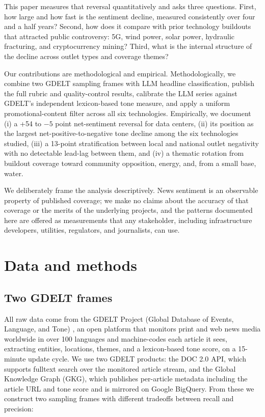 \documentclass[11pt]{article}
\begin{document}
This paper measures that reversal quantitatively and asks three questions.
First, how large and how fast is the sentiment decline, measured
consistently over four and a half years? Second, how does it compare with
prior technology buildouts that attracted public controversy: 5G, wind
power, solar power, hydraulic fracturing, and cryptocurrency mining? Third,
what is the internal structure of the decline across outlet types and
coverage themes?

Our contributions are methodological and empirical. Methodologically, we
combine two GDELT sampling frames with LLM headline classification, publish
the full rubric and quality-control results, calibrate the LLM series
against GDELT's independent lexicon-based tone measure, and apply a uniform
promotional-content filter across all six technologies. Empirically, we
document (i) a +54 to $-5$ point net-sentiment reversal for data centers,
(ii) its position as the largest net-positive-to-negative tone decline among
the six technologies studied, (iii) a 13-point stratification between local
and national outlet negativity with no detectable lead-lag between them, and
(iv) a thematic rotation from buildout coverage toward community opposition,
energy, and, from a small base, water.

We deliberately frame the analysis descriptively. News sentiment is an
observable property of published coverage; we make no claims about the
accuracy of that coverage or the merits of the underlying projects, and the
patterns documented here are offered as measurements that any stakeholder,
including infrastructure developers, utilities, regulators, and journalists,
can use.

\section{Data and methods}

\subsection{Two GDELT frames}

All raw data come from the GDELT Project (Global Database of Events,
Language, and Tone) \cite{leetaru2013}, an open platform that monitors
print and web news media worldwide in over 100
languages and machine-codes each article it sees, extracting entities,
locations, themes, and a lexicon-based tone score, on a 15-minute update
cycle. We use two GDELT products: the DOC 2.0 API, which supports fulltext
search over the monitored article stream, and the Global Knowledge Graph
(GKG), which publishes per-article metadata including the article URL and
tone score and is mirrored on Google BigQuery. From these we construct two
sampling frames with different tradeoffs between recall and precision:
\end{document}
